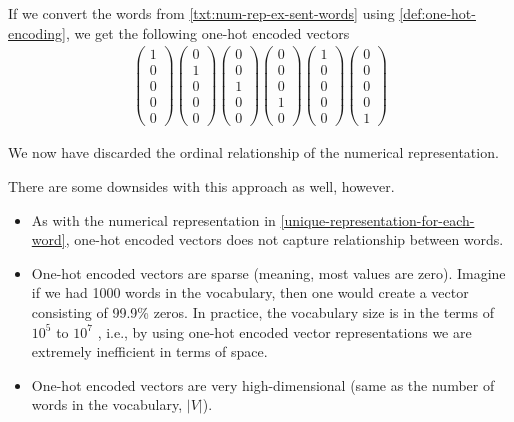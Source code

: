 If we convert the words from  \cref{txt:num-rep-ex-sent-words} using \cref{def:one-hot-encoding}, we get the following one-hot encoded vectors
\begin{align}
    \begin{pmatrix}
    1\\
    0\\
    0\\
    0\\
    0
    \end{pmatrix}
    \begin{pmatrix}
    0\\
    1\\
    0\\
    0\\
    0
    \end{pmatrix}
    \begin{pmatrix}
    0\\
    0\\
    1\\
    0\\
    0
    \end{pmatrix}
    \begin{pmatrix}
    0\\
    0\\
    0\\
    1\\
    0
    \end{pmatrix}
    \begin{pmatrix}
    1\\
    0\\
    0\\
    0\\
    0
    \end{pmatrix}
    \begin{pmatrix}
    0\\
    0\\
    0\\
    0\\
    1
    \end{pmatrix}
\end{align}

We now have discarded the ordinal relationship of the numerical representation.


There are some downsides with this approach as well, however.
\begin{itemize}
    \item As with the numerical representation in \cref{unique-representation-for-each-word}, one-hot encoded vectors does not capture relationship between words.
    \item One-hot encoded vectors are sparse (meaning, most values are zero). Imagine if we had 1000 words in the vocabulary, then one would create a vector consisting of 99.9\% zeros. In practice, the vocabulary size is in the terms of $10^5$ to $10^7$ \cite{mikolov2013b}, i.e., by using one-hot encoded vector representations we are extremely inefficient in terms of space.
    \item One-hot encoded vectors are very high-dimensional (same as the number of words in the vocabulary, $|V|$).
\end{itemize}


